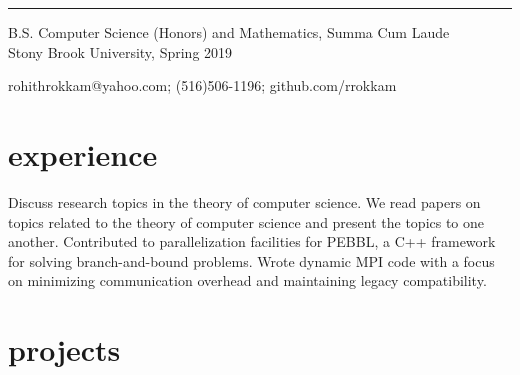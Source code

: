 \documentclass{cv}
\begin{document}
\rule{\textwidth}{0.4pt}
\begin{center}
B.S. Computer Science (Honors) and Mathematics, Summa Cum Laude \\
Stony Brook University, Spring 2019

rohithrokkam@yahoo.com; (516)506-1196; github.com/rrokkam 

\end{center}


\section{experience}

\begin{entrylist}
    {Discuss research topics in the theory of computer science. We read papers on topics related to the theory of computer science and present the topics to one another.}
    {Contributed to parallelization facilities for PEBBL, a C++ framework for solving branch-and-bound problems. Wrote dynamic MPI code with a focus on minimizing communication overhead and maintaining legacy compatibility.}
\end{entrylist}

\section{projects}
\end{document}
